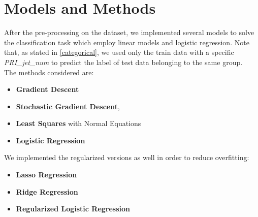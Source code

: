 \documentclass[10pt,conference,compsocconf]{IEEEtran}
\begin{document}
\section{Models and Methods}
\label{models}
After the pre-processing on the dataset, we implemented several models to solve the classification task which employ linear models and logistic regression.
Note that, as stated in \ref{categorical}, we used only the train data with a specific \emph{PRI\_jet\_num} to predict the label of test data belonging to the same group. \\
The methods considered are:
\begin{itemize}
    \item \textbf{Gradient Descent}
    \item \textbf{Stochastic Gradient Descent}, 
    \item \textbf{Least Squares} with Normal Equations
    \item \textbf{Logistic Regression}
    \end{itemize}
We implemented the regularized versions as well in order to reduce overfitting:
\begin{itemize}
\item \textbf{Lasso Regression}
\item \textbf{Ridge Regression}
\item \textbf{Regularized Logistic Regression}
\end{itemize}
\end{document}
